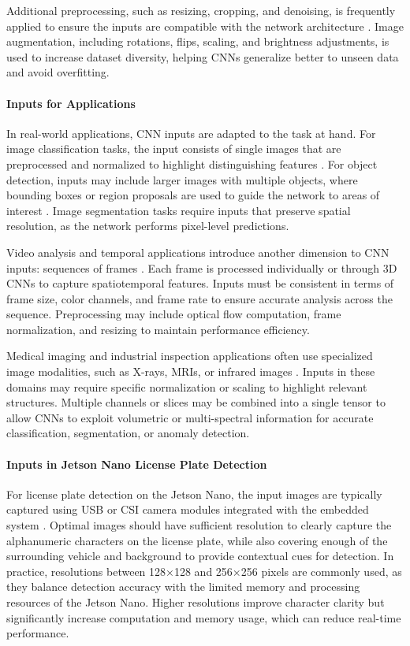 Additional preprocessing, such as resizing, cropping, and denoising, is frequently applied to ensure the inputs are compatible with the network architecture \cite{pinto2022springer}. Image augmentation, including rotations, flips, scaling, and brightness adjustments, is used to increase dataset diversity, helping CNNs generalize better to unseen data and avoid overfitting.

\paragraph{Inputs for Applications}
In real-world applications, CNN inputs are adapted to the task at hand. For image classification tasks, the input consists of single images that are preprocessed and normalized to highlight distinguishing features \cite{goodfellow2016deep}. For object detection, inputs may include larger images with multiple objects, where bounding boxes or region proposals are used to guide the network to areas of interest \cite{ren2015faster}. Image segmentation tasks require inputs that preserve spatial resolution, as the network performs pixel-level predictions.

Video analysis and temporal applications introduce another dimension to CNN inputs: sequences of frames \cite{pinto2022springer}. Each frame is processed individually or through 3D CNNs to capture spatiotemporal features. Inputs must be consistent in terms of frame size, color channels, and frame rate to ensure accurate analysis across the sequence. Preprocessing may include optical flow computation, frame normalization, and resizing to maintain performance efficiency.

Medical imaging and industrial inspection applications often use specialized image modalities, such as X-rays, MRIs, or infrared images \cite{ronneberger2015u, chen2018deeplab}. Inputs in these domains may require specific normalization or scaling to highlight relevant structures. Multiple channels or slices may be combined into a single tensor to allow CNNs to exploit volumetric or multi-spectral information for accurate classification, segmentation, or anomaly detection.

\paragraph{Inputs in Jetson Nano License Plate Detection}

For license plate detection on the Jetson Nano, the input images are typically captured using USB or CSI camera modules integrated with the embedded system \cite{jetsonpytorch}. Optimal images should have sufficient resolution to clearly capture the alphanumeric characters on the license plate, while also covering enough of the surrounding vehicle and background to provide contextual cues for detection. In practice, resolutions between 128×128 and 256×256 pixels are commonly used, as they balance detection accuracy with the limited memory and processing resources of the Jetson Nano. Higher resolutions improve character clarity but significantly increase computation and memory usage, which can reduce real-time performance.

